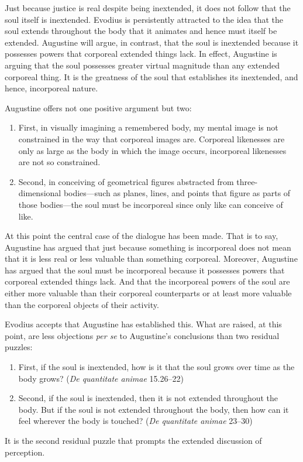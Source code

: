 \documentclass[12pt]{article}
\begin{document}
Just because justice is real despite being inextended, it does not follow that the soul itself is inextended. Evodius is persistently attracted to the idea that the soul extends throughout the body that it animates and hence must itself be extended. Augustine will argue, in contrast, that the soul is inextended because it possesses powers that corporeal extended things lack. In effect, Augustine is arguing that the soul possesses greater virtual magnitude than any extended corporeal thing. It is the greatness of the soul that establishes its inextended, and hence, incorporeal nature.

Augustine offers not one positive argument but two:
\begin{enumerate}
	\item First, in visually imagining a remembered body, my mental image is not constrained in the way that corporeal images are. Corporeal likenesses are only as large as the body in which the image occurs, incorporeal likenesses are not so constrained.
	\item Second, in conceiving of geometrical figures abstracted from three-dimensional bodies—such as planes, lines, and points that figure as parts of those bodies—the soul must be incorporeal since only like can conceive of like.
\end{enumerate}
At this point the central case of the dialogue has been made. That is to say, Augustine has argued that just because something is incorporeal does not mean that it is less real or less valuable than something corporeal. Moreover, Augustine has argued that the soul must be incorporeal because it possesses powers that corporeal extended things lack. And that the incorporeal powers of the soul are either more valuable than their corporeal counterparts or at least more valuable than the corporeal objects of their activity. 


Evodius accepts that Augustine has established this. What are raised, at this point, are less objections \emph{per se} to Augustine's conclusions than two residual puzzles:
\begin{enumerate}
	\item First, if the soul is inextended, how is it that the soul grows over time as the body grows? (\emph{De quantitate animae} 15.26–22)
	\item Second, if the soul is inextended, then it is not extended throughout the body. But if the soul is not extended throughout the body, then how can it feel wherever the body is touched? (\emph{De quantitate animae} 23–30)
\end{enumerate}
It is the second residual puzzle that prompts the extended discussion of perception.
	
\end{document}
